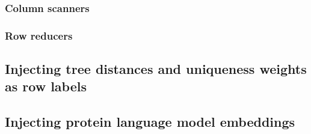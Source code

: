 
\subsubsection{Column scanners}


\subsubsection{Row reducers}


\subsection{Injecting tree distances and uniqueness weights as row labels}


\subsection{Injecting protein language model embeddings}

